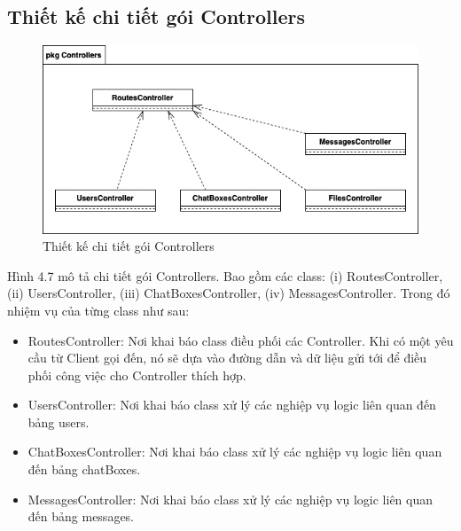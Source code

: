 \documentclass[../DoAn.tex]{subfiles}
\begin{document}
\subsection{Thiết kế chi tiết gói Controllers} 
\begin{figure}[H]
    \centering
    \includegraphics[width=0.9\linewidth]{Hinhve/Package/Controller_Package_Detail_Backend.png}
    \caption{Thiết kế chi tiết gói Controllers}
    \label{fig:use_case_tổng_quan}
\end{figure}
Hình 4.7 mô tả chi tiết gói Controllers. Bao gồm các class: (i) RoutesController, (ii) UsersController, (iii) ChatBoxesController, (iv) MessagesController. Trong đó nhiệm vụ của từng class như sau:
\begin{itemize}
    \item RoutesController: Nơi khai báo class điều phối các Controller. Khi có một yêu cầu từ Client gọi đến, nó sẽ dựa vào đường dẫn và dữ liệu gửi tới để điều phối công việc cho Controller thích hợp.
    \item UsersController: Nơi khai báo class xử lý các nghiệp vụ logic liên quan đến bảng users.
    \item ChatBoxesController: Nơi khai báo class xử lý các nghiệp vụ logic liên quan đến bảng chatBoxes.
    \item MessagesController: Nơi khai báo class xử lý các nghiệp vụ logic liên quan đến bảng messages. 
\end{itemize}\newpage   
\end{document}
